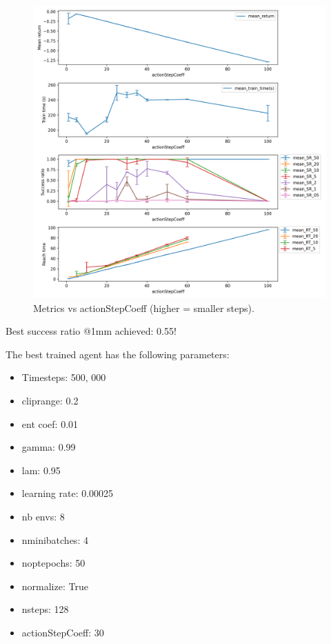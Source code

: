 \documentclass{article}
\begin{document}
\begin{figure}[H]
    \centering
    \includegraphics[width=\textwidth]{../actionStepCoeff.png}
\caption{Metrics vs actionStepCoeff (higher = smaller steps).}
\end{figure}


Best success ratio @1mm achieved: 0.55!

The best trained agent has the following parameters:

\begin{itemize}
  \item Timesteps: 500, 000
  \item cliprange: 0.2
  \item ent coef: 0.01
  \item gamma: 0.99
  \item lam: 0.95
  \item learning rate: 0.00025
  \item nb envs: 8
  \item nminibatches: 4
  \item noptepochs: 50
  \item normalize: True
  \item nsteps: 128
  \item actionStepCoeff: 30
\end{itemize} 
\end{document}
